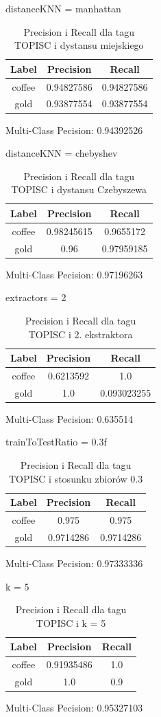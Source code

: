 \documentclass{classrep}
\begin{document}
distanceKNN = manhattan
\begin{table}[H]
\begin{tabular}{|c|c|c|}
\hline
Label  & Precision  & Recall     \\ \hline
coffee & 0.94827586 & 0.94827586 \\ \hline
gold   & 0.93877554 & 0.93877554 \\ \hline
\end{tabular}
\caption{Precision i Recall dla tagu TOPISC i dystansu miejskiego}
\end{table}
Multi-Class Pecision: 0.94392526

distanceKNN = chebyshev
\begin{table}[H]
\begin{tabular}{|c|c|c|}
\hline
Label  & Precision  & Recall     \\ \hline
coffee & 0.98245615 & 0.9655172  \\ \hline
gold   & 0.96       & 0.97959185 \\ \hline
\end{tabular}
\caption{Precision i Recall dla tagu TOPISC i dystansu Czebyszewa}
\end{table}
Multi-Class Pecision: 0.97196263

extractors = 2
\begin{table}[H]
\begin{tabular}{|c|c|c|}
\hline
Label  & Precision & Recall      \\ \hline
coffee & 0.6213592 & 1.0         \\ \hline
gold   & 1.0       & 0.093023255 \\ \hline
\end{tabular}
\caption{Precision i Recall dla tagu TOPISC i 2. ekstraktora}
\end{table}
Multi-Class Pecision: 0.635514

trainToTestRatio = 0.3f
\begin{table}[H]
\begin{tabular}{|c|c|c|}
\hline
Label  & Precision & Recall    \\ \hline
coffee & 0.975     & 0.975     \\ \hline
gold   & 0.9714286 & 0.9714286 \\ \hline
\end{tabular}
\caption{Precision i Recall dla tagu TOPISC i stosunku zbiorów 0.3}
\end{table}
Multi-Class Pecision: 0.97333336

k = 5
\begin{table}[H]
\begin{tabular}{|c|c|c|}
\hline
Label  & Precision  & Recall \\ \hline
coffee & 0.91935486 & 1.0    \\ \hline
gold   & 1.0        & 0.9    \\ \hline
\end{tabular}
\caption{Precision i Recall dla tagu TOPISC i k = 5}
\end{table}
Multi-Class Pecision: 0.95327103
\end{document}
